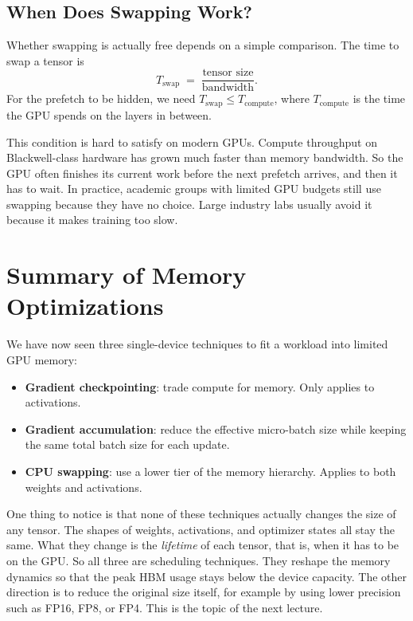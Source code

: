 \subsection{When Does Swapping Work?}

Whether swapping is actually free depends on a simple comparison. The time to swap a tensor is
\[
T_{\text{swap}} \;=\; \frac{\text{tensor size}}{\text{bandwidth}}.
\]
For the prefetch to be hidden, we need $T_{\text{swap}} \le T_{\text{compute}}$, where $T_{\text{compute}}$ is the time the GPU spends on the layers in between.

This condition is hard to satisfy on modern GPUs. Compute throughput on Blackwell-class hardware has grown much faster than memory bandwidth. So the GPU often finishes its current work before the next prefetch arrives, and then it has to wait. In practice, academic groups with limited GPU budgets still use swapping because they have no choice. Large industry labs usually avoid it because it makes training too slow.

\section{Summary of Memory Optimizations}

We have now seen three single-device techniques to fit a workload into limited GPU memory:
\begin{itemize}
    \item \textbf{Gradient checkpointing}: trade compute for memory. Only applies to activations.
    \item \textbf{Gradient accumulation}: reduce the effective micro-batch size while keeping the same total batch size for each update.
    \item \textbf{CPU swapping}: use a lower tier of the memory hierarchy. Applies to both weights and activations.
\end{itemize}

One thing to notice is that none of these techniques actually changes the size of any tensor. The shapes of weights, activations, and optimizer states all stay the same. What they change is the \emph{lifetime} of each tensor, that is, when it has to be on the GPU. So all three are scheduling techniques. They reshape the memory dynamics so that the peak HBM usage stays below the device capacity. The other direction is to reduce the original size itself, for example by using lower precision such as FP16, FP8, or FP4. This is the topic of the next lecture.

